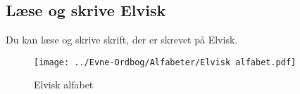 \subsection*{Læse og skrive Elvisk}
Du kan læse og skrive skrift, der er skrevet på Elvisk.\\
\begin{figure}[H]
    \centering
    \texttt{[image: ../Evne-Ordbog/Alfabeter/Elvisk alfabet.pdf]}
    \caption{Elvisk alfabet}
\end{figure}
